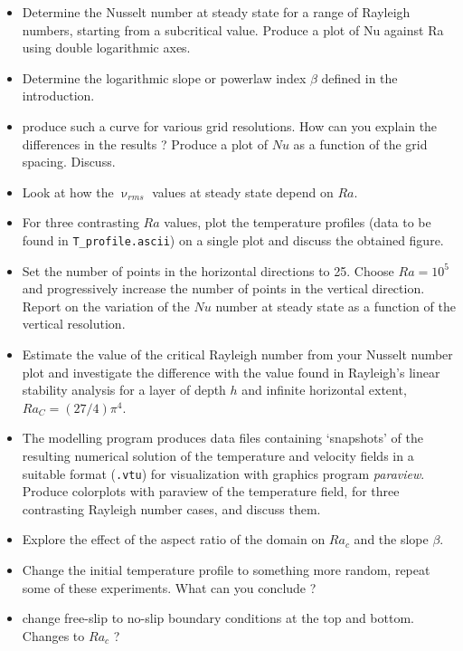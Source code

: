 \begin{itemize}
\item Determine the Nusselt number at steady state for a range of Rayleigh numbers, 
starting from a subcritical value. 
Produce a plot of Nu against Ra using double logarithmic axes.
\item Determine the logarithmic slope or powerlaw index $\beta$ defined in the introduction.

\item produce such a curve for various grid resolutions. How can you explain the differences in the results ? Produce a plot 
of $Nu$ as a function of the grid spacing. Discuss.

\item Look at how the $\upnu_{rms}$ values at steady state depend on $Ra$. 

\item For three contrasting $Ra$ values, plot the temperature profiles (data to be found in {\tt T\_profile.ascii}) on a single plot and discuss the obtained figure.

\item Set the number of points in the horizontal directions to 25. Choose $Ra=10^5$ and progressively increase the number 
of points in the vertical direction. Report on the variation of the $Nu$ number at steady state as a function of the vertical
resolution.

\item Estimate the value of the critical Rayleigh number from your Nusselt number plot and investigate the 
difference with the value found in Rayleigh's linear stability analysis for a layer of depth $h$ and infinite horizontal extent, 
$Ra_C = (27/4)  \pi^4$.

\item The modelling program produces data files containing ‘snapshots’ of the resulting numerical solution 
of the temperature and velocity fields in a suitable format ({\tt .vtu}) for visualization with graphics program {\sl paraview}. 
Produce colorplots with paraview of the temperature field, for three contrasting Rayleigh number cases, and discuss them.

\item Explore the effect of the aspect ratio of the domain on $Ra_c$ and the slope $\beta$.

\item Change the initial temperature profile to something more random, repeat some of these experiments. What can you conclude ?

\item change free-slip to no-slip boundary conditions at the top and bottom. Changes to $Ra_c$ ?

\end{itemize}


